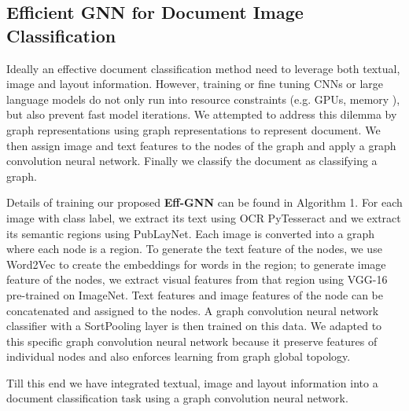 \documentclass[letterpaper]{article}
\begin{document}
\subsection{Efficient GNN for Document Image Classification}
Ideally an effective document classification method need to leverage both textual, image and layout information. However, training or fine tuning CNNs or large language models do not only run into resource constraints (e.g. GPUs, memory ), but also prevent fast model iterations. We attempted to address this dilemma by graph representations using graph representations to represent document. We then assign image and text features to the nodes of the graph and apply a graph convolution neural network. Finally we classify the document as classifying a graph. \par



Details of training our proposed \textbf{Eff-GNN} can be found in Algorithm 1. For each image with class label, we extract its text using OCR PyTesseract and we extract its semantic regions using PubLayNet. Each image is converted into a graph where each node is a region. To generate the text feature of the nodes, we use Word2Vec to create the embeddings for words in the region; to generate image feature of the nodes, we extract visual features from that region using VGG-16 pre-trained on ImageNet. Text features and image features of the node can be concatenated and assigned to the nodes. A graph convolution neural network classifier with a SortPooling \cite{dgcnn} layer is then trained on this data. We adapted to this specific graph convolution neural network because it preserve features of individual nodes and also enforces learning from graph global topology. \par 
Till this end we have integrated textual, image and layout information into a document classification task using a graph convolution neural network.  
\end{document}
